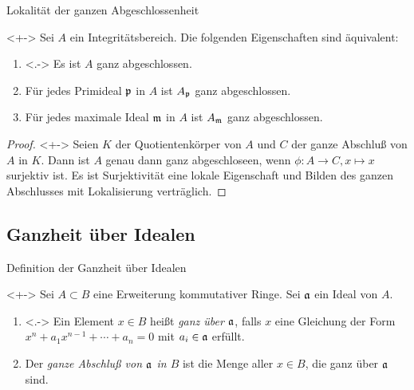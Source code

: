 \begin{frame}{Lokalität der ganzen Abgeschlossenheit}
	\begin{proposition}<+->
		Sei \(A\) ein Integritätsbereich. Die folgenden Eigenschaften sind
		äquivalent:
		\begin{enumerate}[<+->]
		\item<.->
			Es ist \(A\) ganz abgeschlossen.
		\item
			Für jedes Primideal \(\mathfrak{p}\) in \(A\) ist \(A_{\mathfrak{p}}\)
			ganz abgeschlossen.
		\item
			Für jedes maximale Ideal \(\mathfrak{m}\) in \(A\) ist \(A_{\mathfrak{m}}\)
			ganz abgeschlossen.
		\end{enumerate}
	\end{proposition}
	\begin{proof}<+->
		Seien \(K\) der Quotientenkörper von \(A\) und \(C\) der ganze Abschluß
		von \(A\) in \(K\). Dann ist \(A\) genau dann ganz abgeschloseen,
		wenn \(\phi\colon A \to C, x \mapsto x\) surjektiv ist. Es ist
		Surjektivität eine lokale Eigenschaft und Bilden des ganzen Abschlusses
		mit Lokalisierung verträglich.
	\end{proof}
\end{frame}

\subsection{Ganzheit über Idealen}

\begin{frame}{Definition der Ganzheit über Idealen}
	\begin{definition}<+->
		Sei \(A \subset B\) eine Erweiterung kommutativer Ringe. Sei
		\(\mathfrak{a}\) ein Ideal von \(A\).
		\begin{enumerate}[<+->]
		\item<.->
			Ein Element \(x \in B\) heißt
			\emph{ganz über \(\mathfrak{a}\)}, falls \(x\) eine Gleichung der
			Form \(x^n + a_1 x^{n - 1} + \dotsb + a_n = 0\) mit \(a_i \in \mathfrak{a}\)
			erfüllt.
		\item
			Der \emph{ganze Abschluß von \(\mathfrak{a}\) in \(B\)} ist die Menge
			aller \(x \in B\), die ganz über \(\mathfrak{a}\) sind.
		\end{enumerate}
	\end{definition}
\end{frame}

